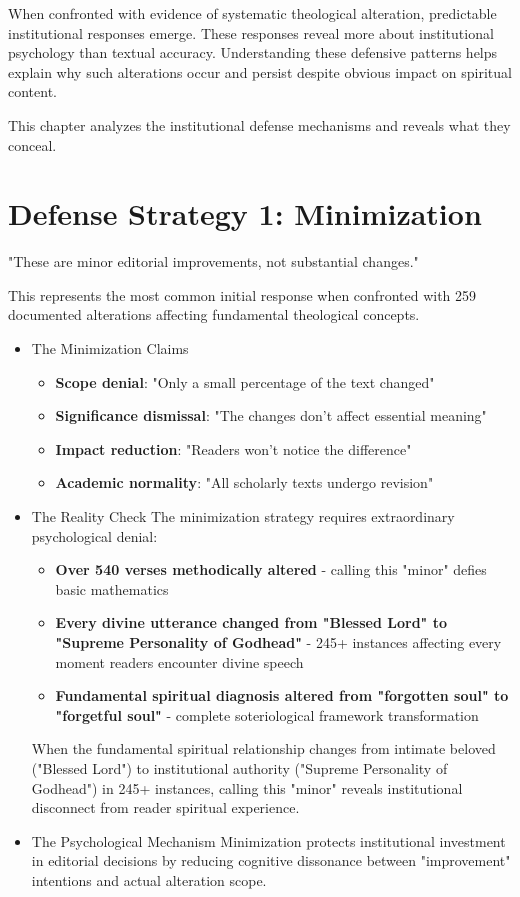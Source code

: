 \documentclass[11pt,twoside]{book}
\begin{document}
\normalfont\justifying
When confronted with evidence of systematic theological alteration, predictable institutional responses emerge. These responses reveal more about institutional psychology than textual accuracy. Understanding these defensive patterns helps explain why such alterations occur and persist despite obvious impact on spiritual content.

This chapter analyzes the institutional defense mechanisms and reveals what they conceal.
\section*{Defense Strategy 1: Minimization}
\label{sec:org0f54689}

"These are minor editorial improvements, not substantial changes."

This represents the most common initial response when confronted with 259 documented alterations affecting fundamental theological concepts.
\begin{itemize}
\item The Minimization Claims
\label{sec:org21964cc}
\begin{itemize}
\item \textbf{\textbf{Scope denial}}: "Only a small percentage of the text changed"
\item \textbf{\textbf{Significance dismissal}}: "The changes don't affect essential meaning"
\item \textbf{\textbf{Impact reduction}}: "Readers won't notice the difference"
\item \textbf{\textbf{Academic normality}}: "All scholarly texts undergo revision"
\end{itemize}
\item The Reality Check
\label{sec:orgf449499}
The minimization strategy requires extraordinary psychological denial:
\begin{itemize}
\item \textbf{\textbf{Over 540 verses methodically altered}} - calling this "minor" defies basic mathematics
\item \textbf{\textbf{Every divine utterance changed from "Blessed Lord" to "Supreme Personality of Godhead"}} - 245+ instances affecting every moment readers encounter divine speech
\item \textbf{\textbf{Fundamental spiritual diagnosis altered from "forgotten soul" to "forgetful soul"}} - complete soteriological framework transformation
\end{itemize}

When the fundamental spiritual relationship changes from intimate beloved ("Blessed Lord") to institutional authority ("Supreme Personality of Godhead") in 245+ instances, calling this "minor" reveals institutional disconnect from reader spiritual experience.
\item The Psychological Mechanism
\label{sec:orgc1db164}
Minimization protects institutional investment in editorial decisions by reducing cognitive dissonance between "improvement" intentions and actual alteration scope.
\end{itemize}
\end{document}

